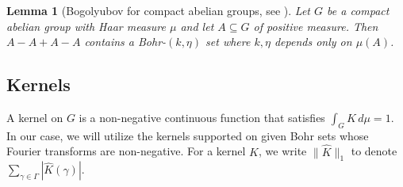 \documentclass[10pt]{article}
\newtheorem{lemma}[lemma]{Lemma}
\theoremstyle{definition}
\begin{document}
\setcounter{theorem}{2}
\begin{lemma}[Bogolyubov for compact abelian groups, see {\cite[Lemma 2.1]{ruzsa6}}]
\label{lem:bogolyubov_compact_group}
Let $G$ be a compact abelian group with Haar measure $\mu$ and let $A \subseteq G$ of positive measure. Then $A - A + A - A$ contains a Bohr-$(k, \eta)$ set where $k, \eta$ depends only on $\mu(A)$.
\end{lemma}

\subsection{Kernels}
A kernel on $G$ is a non-negative continuous function that satisfies $\int_G K \, d\mu =1$. In our case, we will utilize the kernels supported on given Bohr sets whose Fourier transforms are non-negative. For a kernel $K$, we write $\lVert \widehat{K} \rVert_1$ to denote $\sum_{\gamma \in \Gamma} | \widehat{K}(\gamma)|$.  
\end{document}
